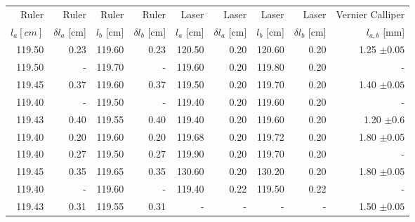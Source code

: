 \begin{tabular}{rrrrrrrrr}
\hline
Ruler & Ruler & Ruler & Ruler & Laser & Laser & Laser & Laser & Vernier Calliper \\
   $l_a [cm]$ &  $\delta l_a$ [cm] &   $l_b$ [cm] &   $\delta l_b$ [cm] &   $l_a$ [cm] &   $\delta l_a$ [cm] & $l_b$ [cm] &   $\delta l_b$ [cm] & $l_{a, b}$ [mm] \\
\hline
           119.50 &              0.23 &           119.60 &              0.23 &           120.50 &              0.20 &           120.60 &              0.20 &                         1.25 $\pm 0.05$ \\
           119.50 &              - &           119.70 &              - &           119.60 &              0.20 &           119.80 &              0.20 &                         - \\
           119.45 &              0.37 &           119.60 &              0.37 &           119.50 &              0.20 &           119.70 &              0.20 &                         1.40 $\pm 0.05$\\
           119.40 &              - &           119.50 &              - &           119.40 &              0.20 &           119.60 &              0.20 &                         - \\
           119.43 &              0.40 &           119.55 &              0.40 &           119.40 &              0.20 &           119.60 &              0.20 &                         1.20 $\pm $0.6\\
           119.40 &              0.20 &           119.60 &              0.20 &           119.68 &              0.20 &           119.72 &              0.20 &                         1.80 $\pm $0.05\\
           119.40 &              0.27 &           119.50 &              0.27 &           119.90 &              0.20 &           119.70 &              0.20 &                                    - \\
           119.45 &              0.35 &           119.65 &              0.35 &           130.60 &              0.20 &           130.20 &              0.20 &                         1.80 $\pm $0.05\\
           119.40 &              - &           119.60 &              - &           119.40 &              0.22 &           119.50 &              0.22 &                         - \\
           119.43 &              0.31 &           119.55 &              0.31 &             - &              - &             - &              - &                         1.50 $\pm 0.05$\\
\hline
\end{tabular}
